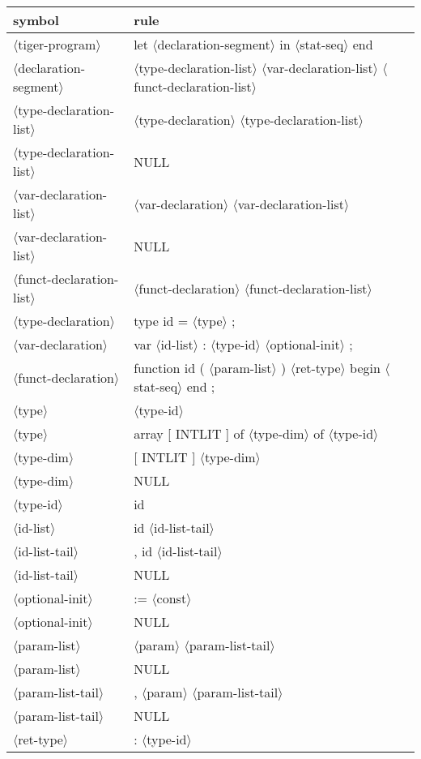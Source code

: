 \documentclass[11pt, fleqn]{article}
\newcommand{\atag}[1]{$\langle$#1$\rangle$}
\begin{document}
\begin{longtable}{l|l}
symbol							&	rule								\\
\hline
\atag{tiger-program}				&	let \atag{declaration-segment} in \atag{stat-seq} end				\\
\atag{declaration-segment}		&	\atag{type-declaration-list}	\atag{var-declaration-list} \atag{funct-declaration-list}	\\
\atag{type-declaration-list}		&	\atag{type-declaration} \atag{type-declaration-list}	\\
\atag{type-declaration-list}		&	NULL		\\
\atag{var-declaration-list}		&	\atag{var-declaration} \atag{var-declaration-list}	\\
\atag{var-declaration-list}		&	NULL		\\
\atag{funct-declaration-list}	&	\atag{funct-declaration} \atag{funct-declaration-list}	\\
\atag{type-declaration}			&	type id = \atag{type} ;		\\
\atag{var-declaration}			&	var \atag{id-list} : \atag{type-id} \atag{optional-init} ;		\\
\atag{funct-declaration}			&	function id ( \atag{param-list} ) \atag{ret-type} begin \atag{stat-seq} end ;	\\
\atag{type}						&	\atag{type-id}		\\
\atag{type}						&	array [ INTLIT ] of \atag{type-dim} of \atag{type-id}	\\
\atag{type-dim}					&	[ INTLIT ] \atag{type-dim}	\\
\atag{type-dim}					&	NULL		\\
\atag{type-id}					&	id		\\
\atag{id-list}					&	id \atag{id-list-tail}		\\
\atag{id-list-tail}				&	, id \atag{id-list-tail}		\\
\atag{id-list-tail}				&	NULL		\\
\atag{optional-init}				&	:= \atag{const}		\\
\atag{optional-init}				&	NULL		\\
\atag{param-list}				&	\atag{param}	 \atag{param-list-tail}	\\
\atag{param-list}				&	NULL		\\
\atag{param-list-tail}			&	, \atag{param} \atag{param-list-tail}		\\
\atag{param-list-tail}			&	NULL		\\
\atag{ret-type}					&	: \atag{type-id}		\\

\end{longtable}
\end{document}
